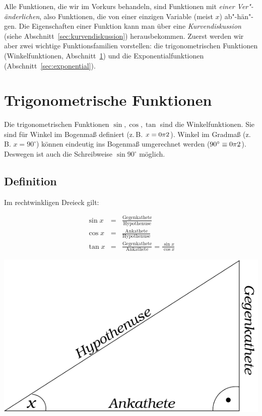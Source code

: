 \noindent Alle Funktionen, die wir im Vorkurs behandeln, sind Funktionen mit \emph{einer Ver"-änderlichen}, also Funktionen, die von einer einzigen Variable (meist $x$) ab"-hän"-gen. Die Eigenschaften einer Funktion kann man über eine \emph{Kurvendiskussion} (siehe Abschnitt~\ref{sec:kurvendiskussion}) herausbekommen. Zuerst werden wir aber zwei wichtige Funktionsfamilien vorstellen: die trigonometrischen Funktionen (Winkelfunktionen, Abschnitt~\ref{sec:trigonometrie}) und die Exponentialfunktionen (Abschnitt~\ref{sec:exponential}).

\section{Trigonometrische Funktionen}
\label{sec:trigonometrie}

Die trigonometrischen Funktionen $\sin, \cos, \tan$ sind die
Winkelfunktionen. Sie sind für Winkel im Bogenmaß definiert (z.\,B. $ x =
\pitwo$). Winkel im Gradmaß (z.\,B. $ x = 90^\circ$) können
eindeutig ins Bogenmaß umgerechnet werden ($90^\circ \equiv \pitwo$).
Deswegen ist auch die Schreibweise $\sin 90^\circ$ möglich.

\subsection{Definition}
Im rechtwinkligen Dreieck gilt:

\begin{minipage}{.5\linewidth}
\begin{eqnarray*}
 \sin x &=& \frac{\text{Gegenkathete}}{\text{Hypothenuse}}\\
 \cos x &=& \frac{\text{Ankathete}}{\text{Hypothenuse}}\\
 \tan x &=& \frac{\text{Gegenkathete}}{\text{Ankathete}} =
\frac{\sin x}{\cos x}
\end{eqnarray*}
\end{minipage}\hspace{.1\linewidth}
\begin{minipage}{.35\textwidth}
 \includegraphics[width=\textwidth]{img/winkel.pdf}
\end{minipage}

